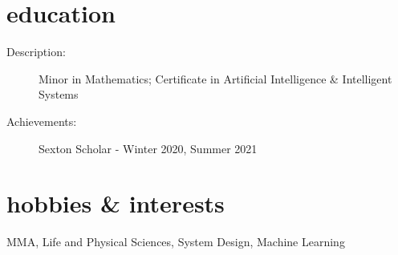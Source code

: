 \documentclass{resume}
\begin{document}
\section*{education}
\begin{description}
  \item[Description:] Minor in Mathematics; Certificate in Artificial Intelligence \& Intelligent Systems
  \item[Achievements:] Sexton Scholar - Winter 2020, Summer 2021
\end{description}
\section*{hobbies \& interests}
MMA, Life and Physical Sciences, System Design, Machine Learning
\end{document}
